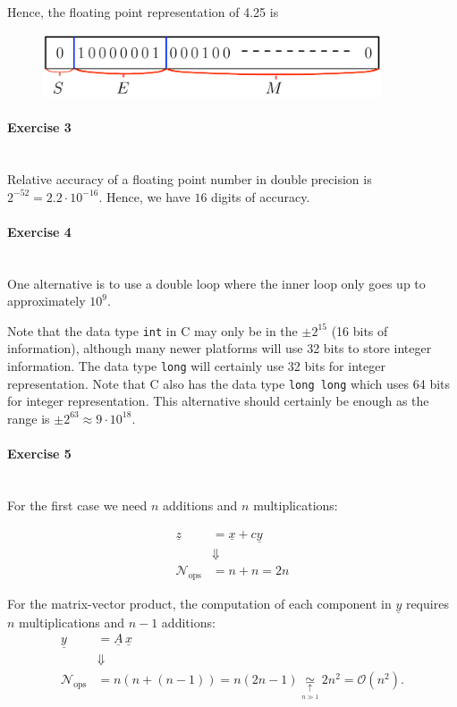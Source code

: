 \documentclass[11pt]{article}
\begin{document}
Hence, the floating point representation of 4.25 is

\begin{figure}[!h]
  \centering
  \includegraphics[width=10cm]{FloatingPointRep}
\end{figure}


\paragraph{Exercise 3} \ \\
Relative accuracy of a floating point number in double precision is $2^{-52} = 2.2 \cdot 10^{-16}$. Hence, we have $16$ digits of accuracy.

\paragraph{Exercise 4} \ \\
One alternative is to use a double loop where the inner loop only goes up to approximately $10^9$. 

Note that the data type \texttt{int} in C may only be in the 
$\pm 2^{15}$ (16 bits of information), although many newer platforms will use  
32 bits to store integer information. The data type \texttt{long} will certainly use 32 bits
for integer representation. Note that C also has the data type \texttt{long long} 
which uses 64 bits for integer representation. This alternative should certainly 
be enough as the range is $\pm 2^{63} \approx 9\cdot 10^{18}$.

\paragraph{Exercise 5} \ \\
For the first case we need $n$ additions and $n$ multiplications:

\begin{align*}
  \underline{z} &= \underline{x} + c \underline{y} \\
  &\Downarrow \\
  \mathcal{N}_{\text{ops}} &= n + n = 2n 
\end{align*}

For the matrix-vector product, the computation of each component in $\underline{y}$ requires $n$ multiplications and $n-1$ additions:
\begin{align*}
  \underline{y} &= \underline{A} \, \underline{x} \\
  &\Downarrow \\
  \mathcal{N}_{\text{ops}} &= n(n + (n-1)) = n (2n-1) \underset{\underset{n \gg 1}{\uparrow}}{\simeq} 2n^2 = \mathcal{O}(n^2). 
\end{align*}
\end{document}
